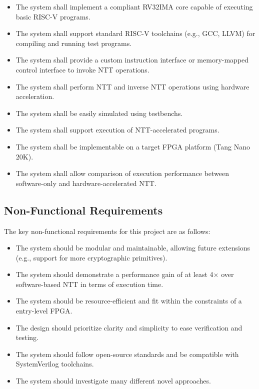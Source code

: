 \documentclass[a4paper, 12pt, titlepage]{article}
\begin{document}
\begin{itemize}
    \item The system shall implement a compliant RV32IMA core capable of executing basic RISC-V programs.
    \item The system shall support standard RISC-V toolchains (e.g., GCC, LLVM) for compiling and running test programs.
    \item The system shall provide a custom instruction interface or memory-mapped control interface to invoke NTT operations.
    \item The system shall perform NTT and inverse NTT operations using hardware acceleration.
    \item The system shall be easily simulated using testbenchs.
    \item The system shall support execution of NTT-accelerated programs.
    \item The system shall be implementable on a target FPGA platform (Tang Nano 20K).
    \item The system shall allow comparison of execution performance between software-only and hardware-accelerated NTT.
\end{itemize}

\subsection{Non-Functional Requirements}

The key non-functional requirements for this project are as follows:

\begin{itemize}
    \item The system should be modular and maintainable, allowing future extensions (e.g., support for more cryptographic primitives).
    \item The system should demonstrate a performance gain of at least 4× over software-based NTT in terms of execution time.
    \item The system should be resource-efficient and fit within the constraints of a entry-level FPGA.
    \item The design should prioritize clarity and simplicity to ease verification and testing.
    \item The system should follow open-source standards and be compatible with SystemVerilog toolchains.
    \item The system should investigate many different novel approaches.
\end{itemize}
\end{document}
